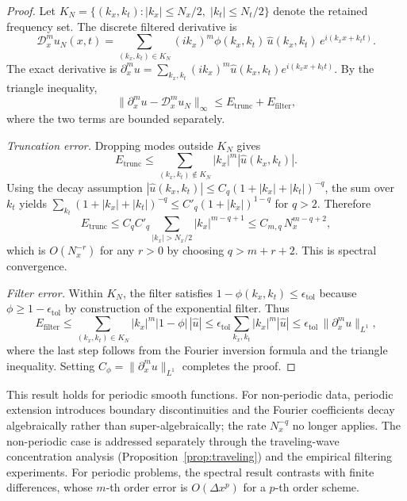 \documentclass[preprint,12pt]{elsarticle}
\begin{document}
\begin{proof}
Let $K_N = \{(k_x,k_t): |k_x|\le N_x/2,\; |k_t|\le N_t/2\}$ denote the retained frequency set. The discrete filtered derivative is
\begin{equation}
\mathcal{D}_x^m u_N(x,t) = \sum_{(k_x,k_t)\in K_N} (ik_x)^m \phi(k_x,k_t)\,\hat{u}(k_x,k_t)\,e^{i(k_x x+k_t t)}.
\end{equation}
The exact derivative is $\partial_x^m u = \sum_{k_x,k_t} (ik_x)^m \hat{u}(k_x,k_t) e^{i(k_x x+k_t t)}$. By the triangle inequality,
\begin{equation}
\|\partial_x^m u - \mathcal{D}_x^m u_N\|_\infty \le E_{\mathrm{trunc}} + E_{\mathrm{filter}},
\end{equation}
where the two terms are bounded separately.

\textit{Truncation error.} Dropping modes outside $K_N$ gives
\begin{equation}
E_{\mathrm{trunc}} \le \sum_{(k_x,k_t)\notin K_N} |k_x|^m |\hat{u}(k_x,k_t)|.
\end{equation}
Using the decay assumption $|\hat{u}(k_x,k_t)|\le C_q(1+|k_x|+|k_t|)^{-q}$, the sum over $k_t$ yields $\sum_{k_t}(1+|k_x|+|k_t|)^{-q}\le C'_q(1+|k_x|)^{1-q}$ for $q>2$. Therefore
\begin{equation}
E_{\mathrm{trunc}} \le C_q C'_q \sum_{|k_x|>N_x/2} |k_x|^{m-q+1} \le C_{m,q}\, N_x^{m-q+2},
\end{equation}
which is $O(N_x^{-r})$ for any $r>0$ by choosing $q>m+r+2$. This is spectral convergence.

\textit{Filter error.} Within $K_N$, the filter satisfies $1-\phi(k_x,k_t)\le \epsilon_{\mathrm{tol}}$ because $\phi\ge 1-\epsilon_{\mathrm{tol}}$ by construction of the exponential filter. Thus
\begin{equation}
E_{\mathrm{filter}} \le \sum_{(k_x,k_t)\in K_N} |k_x|^m |1-\phi|\,|\hat{u}| \le \epsilon_{\mathrm{tol}} \sum_{k_x,k_t} |k_x|^m |\hat{u}| \le \epsilon_{\mathrm{tol}}\,\|\partial_x^m u\|_{L^1},
\end{equation}
where the last step follows from the Fourier inversion formula and the triangle inequality. Setting $C_\phi=\|\partial_x^m u\|_{L^1}$ completes the proof.
\end{proof}

This result holds for periodic smooth functions. For non-periodic data, periodic extension introduces boundary discontinuities and the Fourier coefficients decay algebraically rather than super-algebraically; the rate $N_x^{-q}$ no longer applies. The non-periodic case is addressed separately through the traveling-wave concentration analysis (Proposition~\ref{prop:traveling}) and the empirical filtering experiments. For periodic problems, the spectral result contrasts with finite differences, whose $m$-th order error is $O(\Delta x^p)$ for a $p$-th order scheme.
\end{document}
